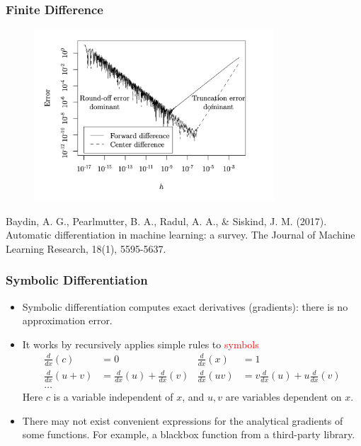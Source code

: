 \documentclass{beamer}
\begin{document}
\begin{frame}
	\frametitle{Finite Difference}
	\begin{figure}[hbt]
	\centering
  \includegraphics[width=0.8\textwidth]{figures/fd_error}
\end{figure}
\vspace{-0.5cm}
\scriptsize{Baydin, A. G., Pearlmutter, B. A., Radul, A. A., \& Siskind, J. M. (2017). Automatic differentiation in machine learning: a survey. The Journal of Machine Learning Research, 18(1), 5595-5637.}
\end{frame}

\begin{frame}
	\frametitle{Symbolic Differentiation }
		
	\begin{itemize}
		\item Symbolic differentiation computes exact derivatives (gradients): there is no approximation error. 
		\item It works by recursively applies simple rules to \textcolor{red}{symbols}
		\begin{align*}
			\frac{d}{dx}(c) &= 0  & \frac{d}{dx}(x) &= 1\\
			\frac{d}{dx}(u+v) &= \frac{d}{dx}(u) + \frac{d}{dx}(v) & \frac{d}{dx}(uv) &= v\frac{d}{dx}(u)+u\frac{d}{dx}(v)\\
			\ldots
		\end{align*}
		Here $c$ is a variable independent of $x$, and $u, v$ are variables dependent on $x$. 
	
		\item There may not exist convenient expressions for the analytical gradients of some functions. For example, a blackbox function from a third-party library. 
		
	\end{itemize}
\end{frame}
\end{document}
